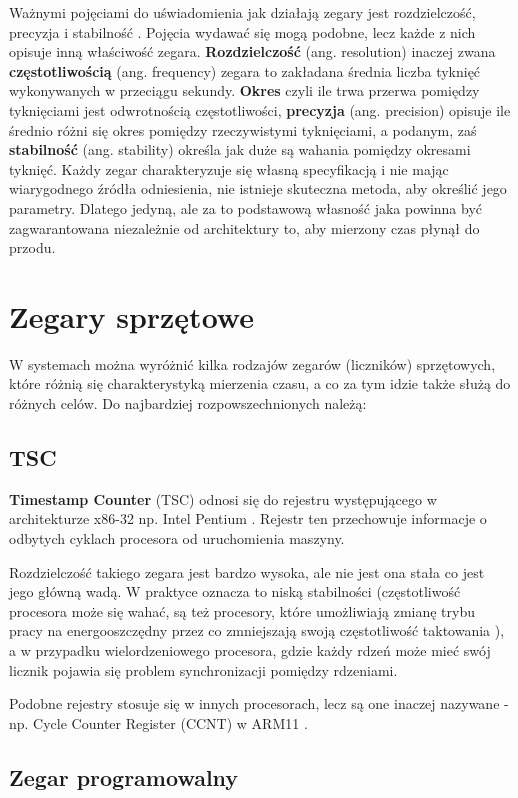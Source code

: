 \documentclass[shortabstract]{iithesis}
\theoremstyle{definition} \newtheorem*{definition}{Definicja}
\theoremstyle{definition} \newtheorem*{example}{Przykład}
\theoremstyle{definition} \newtheorem*{remark}{Uwaga}
\begin{document}
Ważnymi pojęciami do uświadomienia jak działają zegary jest rozdzielczość, precyzja i stabilność \cite{bib:timecounters}. Pojęcia wydawać się mogą podobne, lecz każde z nich opisuje inną właściwość zegara.  \textbf{Rozdzielczość} (ang. resolution) inaczej zwana \textbf{częstotliwością} (ang. frequency) zegara to zakładana średnia liczba tyknięć wykonywanych w przeciągu sekundy. \textbf{Okres} czyli ile trwa przerwa pomiędzy tyknięciami jest odwrotnością częstotliwości, \textbf{precyzja} (ang. precision) opisuje ile średnio różni się okres pomiędzy rzeczywistymi tyknięciami, a podanym, zaś \textbf{stabilność} (ang. stability) określa jak duże są wahania pomiędzy okresami tyknięć. Każdy zegar charakteryzuje się własną specyfikacją i nie mając wiarygodnego źródła odniesienia, nie istnieje skuteczna metoda, aby określić jego parametry. Dlatego jedyną, ale za to podstawową własność jaka powinna być zagwarantowana niezależnie od architektury to, aby mierzony czas płynął do przodu.

\section{Zegary sprzętowe}
W systemach można wyróżnić kilka rodzajów zegarów (liczników) sprzętowych, które różnią się charakterystyką mierzenia czasu, a co za tym idzie także służą do różnych celów. Do najbardziej rozpowszechnionych należą:

\subsection{TSC}
\textbf{Timestamp Counter} (TSC) odnosi się do rejestru występującego w architekturze x86-32 np. Intel Pentium \cite{bib:lpi}. Rejestr ten przechowuje informacje o odbytych cyklach procesora od uruchomienia maszyny.

Rozdzielczość takiego zegara jest bardzo wysoka, ale nie jest ona stała co jest jego główną wadą. W praktyce oznacza to niską stabilności (częstotliwość procesora może się wahać, są też procesory, które umożliwiają zmianę trybu pracy na energooszczędny przez co zmniejszają swoją częstotliwość taktowania \cite{bib:freebsd-os}), a w przypadku wielordzeniowego procesora, gdzie każdy rdzeń może mieć swój licznik pojawia się problem synchronizacji pomiędzy rdzeniami.

Podobne rejestry stosuje się w innych procesorach, lecz są one inaczej nazywane - np. Cycle Counter Register (CCNT) w ARM11 \cite{bib:ccnt}.

\subsection{Zegar programowalny}
\end{document}
